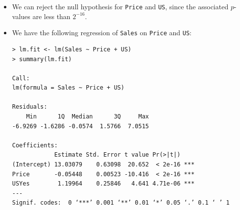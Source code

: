 \begin{itemize}
\begin{equation*}
\begin{split}
\begin{cases}
                    \beta_0 + \beta_1x_i + \epsilon_i \quad
                    &\text{if $i$th store is neither urban nor US} \\
                \end{cases}.
            \end{split}
        \end{equation*}
    \item[(d)] We can reject the null hypothesis for \verb|Price| and
        \verb|US|, since
        the associated $p$-values are less than $2^{-16}$.
    \item[(e)] We have the following regression of \verb|Sales| on
        \verb|Price| and
        \verb|US|:
        \begin{lstlisting}
> lm.fit <- lm(Sales ~ Price + US)
> summary(lm.fit)

Call:
lm(formula = Sales ~ Price + US)

Residuals:
    Min      1Q  Median      3Q     Max
-6.9269 -1.6286 -0.0574  1.5766  7.0515

Coefficients:
            Estimate Std. Error t value Pr(>|t|)
(Intercept) 13.03079    0.63098  20.652  < 2e-16 ***
Price       -0.05448    0.00523 -10.416  < 2e-16 ***
USYes        1.19964    0.25846   4.641 4.71e-06 ***
---
Signif. codes:  0 ‘***’ 0.001 ‘**’ 0.01 ‘*’ 0.05 ‘.’ 0.1 ‘ ’ 1


\end{lstlisting}
\end{itemize}
